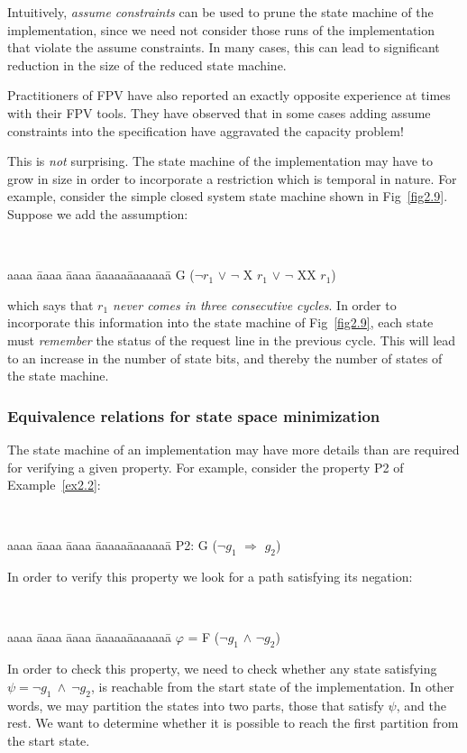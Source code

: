 	\noindent
    Intuitively, {\em assume constraints} can be used to prune the
    state machine of the implementation, since we need not consider
    those runs of the implementation that violate the assume constraints.
    In many cases, this can lead to significant reduction in the size 
	of the reduced state machine.

	\noindent
    Practitioners of FPV have also reported an exactly opposite experience
    at times with their FPV tools. They have observed that in some cases
    adding assume constraints into the specification have aggravated the
    capacity problem!

	\noindent
    This is {\em not} surprising. The state machine of the implementation
    may have to grow in size in order to incorporate a restriction which
    is temporal in nature. For example, consider the simple closed system
    state machine shown in Fig~\ref{fig2.9}. Suppose we add the
    assumption:
	{\tt
	\begin{tabbing}
	aaaa \= aaaa \= aaaa \= aaaaa\= aaaaaaa\= \kill
    \>\>\>\>\> G ($\neg r_1$ $\lor$ $\neg$ X $r_1$ $\lor$ $\neg$ XX $r_1$)
	\end{tabbing}
	}
	\noindent
    which says that {\em $r_1$ never comes in three consecutive cycles}.
    In order to incorporate this information into the state machine of
    Fig~\ref{fig2.9}, each state must {\em remember} the status of the
    request line in the previous cycle. This will lead to an
    increase in the number of state bits, and thereby the number of
    states of the state machine. 
	
\subsubsection{Equivalence relations for state space minimization}
    The state machine of an
    implementation may have more details than are required for verifying
    a given property. For example, consider the property P2 of
    Example~\ref{ex2.2}:
	{\tt
	\begin{tabbing}
	aaaa \= aaaa \= aaaa \= aaaaa\= aaaaaaa\= \kill
    \>\>\>\>\> P2: G ($\neg g_1$ $\Rightarrow$  $g_2$)
	\end{tabbing}
	}
	\noindent
    In order to verify this property we look for a path satisfying its
    negation:
	{\tt
    \begin{tabbing}
    aaaa \= aaaa \= aaaa \= aaaaa\= aaaaaaa\= \kill
    \>\>\>\>\> $\varphi$ = F ($\neg g_1$ $\land$ $\neg g_2$)
	\end{tabbing}
	}
	\noindent
    In order to check this property, we need to check whether any state
    satisfying $\psi = \neg g_1\ \land\ \neg g_2$, is reachable from the
    start state of the implementation. In other words, we may partition
    the states into two parts, those that satisfy $\psi$, and the rest.
    We want to determine whether it is possible to reach the first
    partition from the start state.

